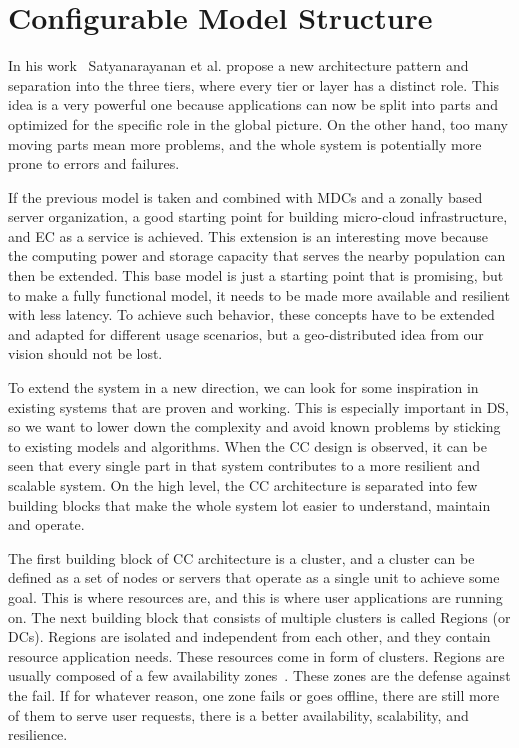 \section{Configurable Model Structure}\label{sec:configurable_model_structure}
%
In his work~\cite{SatyanarayananK19} Satyanarayanan et al. propose a new architecture pattern and separation into the three tiers, where every tier or layer has a distinct role. This idea is a very powerful one because applications can now be split into parts and optimized for the specific role in the global picture. On the other hand, too many moving parts mean more problems, and the whole system is potentially more prone to errors and failures.

If the previous model is taken and combined with MDCs and a zonally based server organization, a good starting point for building micro-cloud infrastructure, and EC as a service is achieved. This extension is an interesting move because the computing power and storage capacity that serves the nearby population can then be extended. This base model is just a starting point that is promising, but to make a fully functional model, it needs to be made more available and resilient with less latency. To achieve such behavior, these concepts have to be extended and adapted for different usage scenarios, but a geo-distributed idea from our vision should not be lost.

To extend the system in a new direction, we can look for some inspiration in existing systems that are proven and working. This is especially important in DS, so we want to lower down the complexity and avoid known problems by sticking to existing models and algorithms. When the CC design is observed, it can be seen that every single part in that system contributes to a more resilient and scalable system. On the high level, the CC architecture is separated into few building blocks that make the whole system lot easier to understand, maintain and operate.

The first building block of CC architecture is a cluster, and a cluster can be defined as a set of nodes or servers that operate as a single unit to achieve some goal. This is where resources are, and this is where user applications are running on. The next building block that consists of multiple clusters is called Regions (or DCs). Regions are isolated and independent from each other, and they contain resource application needs. These resources come in form of clusters. Regions are usually composed of a few availability zones~\cite{SouzaMFAK19}. These zones are the defense against the fail. If for whatever reason, one zone fails or goes offline, there are still more of them to serve user requests, there is a better availability, scalability, and resilience.


